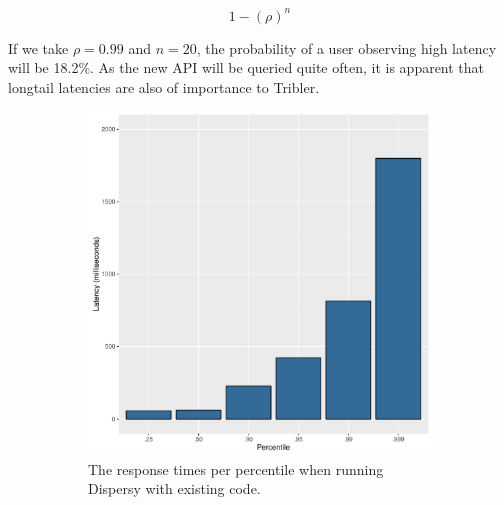 \begin{equation}
	\label{eq:probability_high_latency}
	1 - (\rho)^{n}
\end{equation}

If we take $\rho = 0.99$ and $n = 20$, the probability of a user observing high latency will be 18.2\%.
As the new API will be queried quite often, it is apparent that longtail latencies are also of importance to Tribler.

\begin{figure}[h]
	\begin{subfigure}[b]{.5\linewidth}
		\includegraphics[width=\textwidth]{experimentation/images/response_time_percentiles_sync}
		\caption{The response times per percentile when running Dispersy with existing code.}
		\label{fig:response_times_percentiles_sync}
	\end{subfigure}
	\begin{subfigure}[b]{.5\linewidth}

\end{subfigure}
\end{figure}
